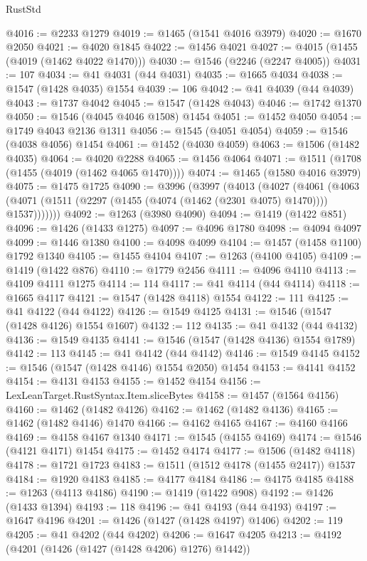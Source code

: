 \begin{lexlean}{RustStd}
\begin{coremodule}
{\begin{coremodule}
{{{{{{{{{{{{{{{{{{{{{{{{{{{{{{@4016 := @2233 @1279
@4019 := @1465 (@1541 @4016 @3979)
@4020 := @1670 @2050
@4021 := @4020 @1845
@4022 := @1456 @4021
@4027 := @4015 (@1455 (@4019 (@1462 @4022 @1470)))
@4030 := @1546 (@2246 (@2247 @4005))
@4031 := 107
@4034 := @41 @4031 (@44 @4031)
@4035 := @1665 @4034
@4038 := @1547 (@1428 @4035) @1554
@4039 := 106
@4042 := @41 @4039 (@44 @4039)
@4043 := @1737 @4042
@4045 := @1547 (@1428 @4043)
@4046 := @1742 @1370
@4050 := @1546 (@4045 @4046 @1508) @1454
@4051 := @1452 @4050
@4054 := @1749 @4043 @2136 @1311
@4056 := @1545 (@4051 @4054)
@4059 := @1546 (@4038 @4056) @1454
@4061 := @1452 (@4030 @4059)
@4063 := @1506 (@1482 @4035)
@4064 := @4020 @2288
@4065 := @1456 @4064
@4071 := @1511 (@1708 (@1455 (@4019 (@1462 @4065 @1470))))
@4074 := @1465 (@1580 @4016 @3979)
@4075 := @1475 @1725
@4090 := @3996
    (@3997
      (@4013
        (@4027
          (@4061
            (@4063 (@4071 (@1511 (@2297 (@1455 (@4074 (@1462 (@2301 @4075) @1470)))) @1537)))))))
@4092 := @1263 (@3980 @4090)
@4094 := @1419 (@1422 @851)
@4096 := @1426 (@1433 @1275)
@4097 := @4096 @1780
@4098 := @4094 @4097
@4099 := @1446 @1380
@4100 := @4098 @4099
@4104 := @1457 (@1458 @1100) @1792 @1340
@4105 := @1455 @4104
@4107 := @1263 (@4100 @4105)
@4109 := @1419 (@1422 @876)
@4110 := @1779 @2456
@4111 := @4096 @4110
@4113 := @4109 @4111 @1275
@4114 := 114
@4117 := @41 @4114 (@44 @4114)
@4118 := @1665 @4117
@4121 := @1547 (@1428 @4118) @1554
@4122 := 111
@4125 := @41 @4122 (@44 @4122)
@4126 := @1549 @4125
@4131 := @1546 (@1547 (@1428 @4126) @1554 @1607)
@4132 := 112
@4135 := @41 @4132 (@44 @4132)
@4136 := @1549 @4135
@4141 := @1546 (@1547 (@1428 @4136) @1554 @1789)
@4142 := 113
@4145 := @41 @4142 (@44 @4142)
@4146 := @1549 @4145
@4152 := @1546 (@1547 (@1428 @4146) @1554 @2050) @1454
@4153 := @4141 @4152
@4154 := @4131 @4153
@4155 := @1452 @4154
@4156 := LexLeanTarget.RustSyntax.Item.sliceBytes
@4158 := @1457 (@1564 @4156)
@4160 := @1462 (@1482 @4126)
@4162 := @1462 (@1482 @4136)
@4165 := @1462 (@1482 @4146) @1470
@4166 := @4162 @4165
@4167 := @4160 @4166
@4169 := @4158 @4167 @1340
@4171 := @1545 (@4155 @4169)
@4174 := @1546 (@4121 @4171) @1454
@4175 := @1452 @4174
@4177 := @1506 (@1482 @4118)
@4178 := @1721 @1723
@4183 := @1511 (@1512 @4178 (@1455 @2417)) @1537
@4184 := @1920 @4183
@4185 := @4177 @4184
@4186 := @4175 @4185
@4188 := @1263 (@4113 @4186)
@4190 := @1419 (@1422 @908)
@4192 := @1426 (@1433 @1394)
@4193 := 118
@4196 := @41 @4193 (@44 @4193)
@4197 := @1647 @4196
@4201 := @1426 (@1427 (@1428 @4197) @1406)
@4202 := 119
@4205 := @41 @4202 (@44 @4202)
@4206 := @1647 @4205
@4213 := @4192 (@4201 (@1426 (@1427 (@1428 @4206) @1276) @1442))
}}}}}}}}}}}}}}}}}}}}}}}}}}}}}}
\end{coremodule}}
\end{coremodule}
\end{lexlean}
